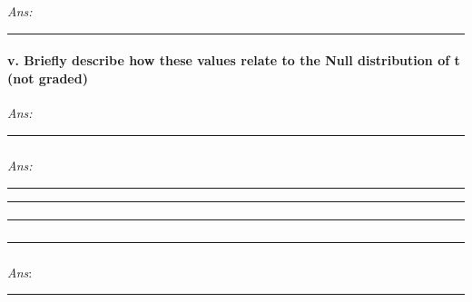 \documentclass[
]{article}
\begin{document}
\emph{Ans:}

\begin{center}\rule{0.5\linewidth}{0.5pt}\end{center}

\hypertarget{v.-briefly-describe-how-these-values-relate-to-the-null-distribution-of-t-not-graded}{%
\paragraph{v. Briefly describe how these values relate to the Null
distribution of t (not
graded)}\label{v.-briefly-describe-how-these-values-relate-to-the-null-distribution-of-t-not-graded}}

\emph{Ans:}

\begin{center}\rule{0.5\linewidth}{0.5pt}\end{center}

\hypertarget{section-9}{%
\subparagraph{}\label{section-9}}

\emph{Ans:}

\begin{center}\rule{0.5\linewidth}{0.5pt}\end{center}

\begin{center}\rule{0.5\linewidth}{0.5pt}\end{center}

\hypertarget{section-10}{%
\paragraph{}\label{section-10}}

\begin{center}\rule{0.5\linewidth}{0.5pt}\end{center}

\hypertarget{section-11}{%
\subparagraph{}\label{section-11}}

\begin{center}\rule{0.5\linewidth}{0.5pt}\end{center}

\hypertarget{section-12}{%
\subparagraph{}\label{section-12}}

\emph{Ans}:

\begin{center}\rule{0.5\linewidth}{0.5pt}\end{center}

\hypertarget{section-13}{%
\subparagraph{}\label{section-13}}
\end{document}
